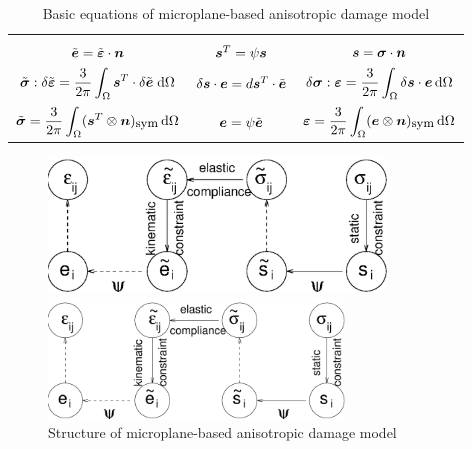 \documentclass[a4paper]{article}
\newcommand{\mbf}[1]{\mbox{\boldmath$#1$}}
\newcommand{\ve}{\mbf{e}}%
\newcommand{\vet}{\tilde{\ve}}
\newcommand{\veps}{\mbf{\varepsilon}}  %
\newcommand{\vsig}{\mbf{\sigma}}%
\newcommand{\vs}{\mbf{s}}%
\newcommand{\vepst}{\tilde{\veps}}
\newcommand{\vst}{\mbf{s}^T}%
\newcommand{\vsigt}{\tilde{\vsig}}
\newcommand{\dvepst}{\delta\tilde{\veps}}
\newcommand{\dvet}{\delta\vet}
\newcommand{\dvs}{\delta\vs}
\newcommand{\dvsig}{\delta\vsig}
\newcommand{\dO}{\,\mbox{d}\Omega}
\newcommand{\sym}{_{\mbox{\small sym}}}
\begin{document}
\begin{table}[!htb]
\caption{Basic equations of microplane-based anisotropic damage model}
\label{tab2}
\begin{center}
\begin{tabular}{|c|c|c|}
\hline
&&\\
$\vet=\vepst\cdot\mbf{n}$
&
$\vst = \psi\vs$
&
$\vs=\vsig\cdot\mbf{n}$
\\[5mm]
$\vsigt:\dvepst = \displaystyle\frac{3}{2\pi} \int_{\Omega}\vst\cdot\dvet\;\mbox{d}\Omega$
&
$\dvs\cdot\ve=d\vst\cdot\vet$
&
$\dvsig:\veps = \displaystyle\frac{3}{2\pi} \int_{\Omega}\dvs\cdot\ve\dO$
\\[5mm]
$\vsigt = \displaystyle\frac{3}{2\pi}\int_\Omega (\vst\otimes\mbf{n})\sym\dO$
&
$\ve=\psi\vet$
&
$\veps = \displaystyle\frac{3}{2\pi}\int_\Omega (\ve\otimes\mbf{n})\sym\dO$
\\[5mm]
\hline
\end{tabular}
\end{center}
\end{table}

\begin{figure}[!htb]
\begin{htmlonly}
  \centerline{\includegraphics[width=0.8\textwidth]{dm_comp.eps}}
\end{htmlonly}
 \centerline{\includegraphics[width=0.7\textwidth]{dm_comp}}
\caption{Structure of microplane-based anisotropic damage model}
\label{ff4}
\end{figure}
\end{document}
